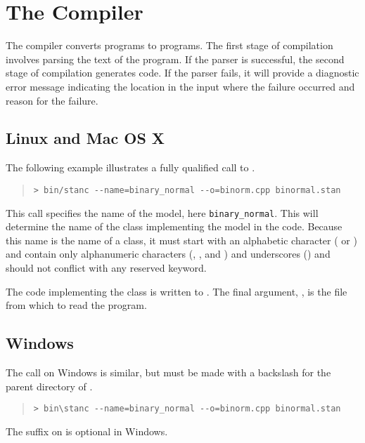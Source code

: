 \section{The \stanc Compiler}

The \stanc compiler converts \Stan programs to \Cpp programs.  The
first stage of compilation involves parsing the text of the \Stan
program.  If the parser is successful, the second stage of compilation
generates \Cpp code.  If the parser fails, it will provide a
diagnostic error message indicating the location in the input where
the failure occurred and reason for the failure.

\subsection{Linux and Mac OS X}

The following example illustrates a fully qualified call to \stanc.%
%
\begin{quote}
\begin{Verbatim}[fontshape=sl]
> bin/stanc --name=binary_normal --o=binorm.cpp binormal.stan 
\end{Verbatim}
\end{quote}
%
This call specifies the name of the model, here {\tt binary\_normal}.
This will determine the name of the class implementing the model in
the \Cpp code.  Because this name is the name of a \Cpp class, it must
start with an alphabetic character ( or ) and
contain only alphanumeric characters (, , and
) and underscores (\code{\_}) and should not conflict with
any \Cpp reserved keyword.  

The \Cpp code implementing the class is written to .
The final argument, , is the file from which to
read the \Stan program.

\subsection{Windows}

The call on Windows is similar, but must be made with a backslash
for the parent directory of .
%
\begin{quote}
\begin{Verbatim}[fontshape=sl]
> bin\stanc --name=binary_normal --o=binorm.cpp binormal.stan 
\end{Verbatim}
\end{quote}
%
The  suffix on  is optional in Windows.

